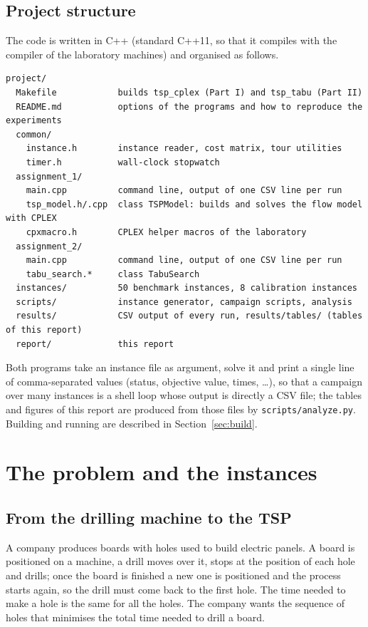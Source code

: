 \documentclass[11pt,a4paper]{article}
\begin{document}
\subsection{Project structure}
The code is written in C++ (standard C++11, so that it compiles with the compiler of the
laboratory machines) and organised as follows.
{\small\begin{verbatim}
project/
  Makefile            builds tsp_cplex (Part I) and tsp_tabu (Part II)
  README.md           options of the programs and how to reproduce the experiments
  common/
    instance.h        instance reader, cost matrix, tour utilities
    timer.h           wall-clock stopwatch
  assignment_1/
    main.cpp          command line, output of one CSV line per run
    tsp_model.h/.cpp  class TSPModel: builds and solves the flow model with CPLEX
    cpxmacro.h        CPLEX helper macros of the laboratory
  assignment_2/
    main.cpp          command line, output of one CSV line per run
    tabu_search.*     class TabuSearch
  instances/          50 benchmark instances, 8 calibration instances
  scripts/            instance generator, campaign scripts, analysis
  results/            CSV output of every run, results/tables/ (tables of this report)
  report/             this report
\end{verbatim}}
Both programs take an instance file as argument, solve it and print a single line of
comma-separated values (status, objective value, times, \ldots), so that a campaign over many
instances is a shell loop whose output is directly a CSV file; the tables and figures of this
report are produced from those files by \texttt{scripts/analyze.py}. Building and running are
described in Section~\ref{sec:build}.

\section{The problem and the instances}\label{sec:problem}
\subsection{From the drilling machine to the TSP}
A company produces boards with holes used to build electric panels. A board is positioned on
a machine, a drill moves over it, stops at the position of each hole and drills; once the
board is finished a new one is positioned and the process starts again, so the drill must
come back to the first hole. The time needed to make a hole is the same for all the holes.
The company wants the sequence of holes that minimises the total time needed to drill a
board.
\end{document}
